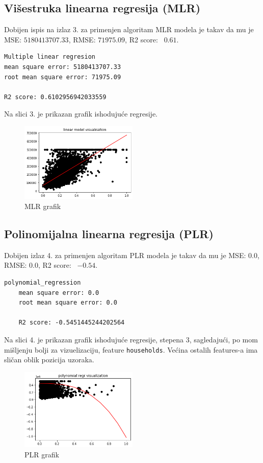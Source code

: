 \documentclass[fontsize=12bp, paper=a4]{scrarticle}
\begin{document}
\subsection{Višestruka linearna regresija (MLR)}
Dobijen ispis na izlaz 3. za primenjen algoritam MLR modela je takav da mu je MSE: $5180413707.33$, RMSE: $71975.09$, R2 score: ~$0.61$.
\begin{lstlisting}[caption=\centering MLR]
Multiple linear regresion
mean square error: 5180413707.33
root mean square error: 71975.09

R2 score: 0.6102956942033559
\end{lstlisting}

Na slici 3. je prikazan grafik ishodujuće regresije.

\begin{figure}[h!]
    \centering
    \includegraphics[width=0.5\textwidth]{4.png}
    \caption{\centering MLR grafik}
\end{figure}      
\subsection{Polinomijalna linearna regresija (PLR)}
Dobijen izlaz 4. za primenjen algoritam PLR modela je takav da mu je MSE: $0.0$, RMSE: $0.0$, R2 score: ~$-0.54$.
\begin{lstlisting}[caption=\centering PLR]
    polynomial_regression
    mean square error: 0.0
    root mean square error: 0.0
    
    R2 score: -0.5451445244202564
\end{lstlisting}
Na slici 4. je prikazan grafik ishodujuće regresije, stepena 3, sagledajući, po mom mišljenju bolji za vizuelizaciju, feature \verb|households|. Većina ostalih features-a ima sličan oblik pozicija uzoraka.

\begin{figure}[h!]
    \centering
    \includegraphics[width=0.5\textwidth]{3.png}
    \caption{\centering PLR grafik}
\end{figure}      
\end{document}
